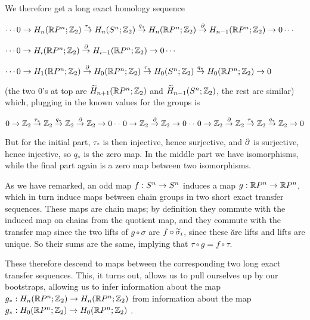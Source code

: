 \vfill
\eject

We therefore get a long exact homology sequence

\ssk

$\cdots 0\ra
H_n(\bbr P^n;\bbz_2)\buildrel{\tau_*}\over\ra
H_n(S^n;\bbz_2)\buildrel{q_*}\over\ra
H_n(\bbr P^n;\bbz_2)\buildrel{\del}\over\ra
H_{n-1}(\bbr P^n;\bbz_2)\ra
0\cdots$

$\cdots 0\ra H_i(\bbr P^n;\bbz_2)\buildrel{\del}\over\ra
H_{i-1}(\bbr P^n;\bbz_2)\ra
0\cdots$

$\cdots 0\ra
H_1(\bbr P^n;\bbz_2)\buildrel{\del}\over\ra
H_0(\bbr P^n;\bbz_2)\buildrel{\tau_*}\over\ra
H_0(S^n;\bbz_2)\buildrel{q_*}\over\ra
H_{0}(\bbr P^n;\bbz_2)\ra
0$

\ssk

(the two $0$'s at top are $\widetilde{H}_{n+1}({\Bbb R} P^n;{\Bbb Z}_2)$ and $\widetilde{H}_{n-1}(S^n;{\Bbb Z}_2)$, 
the rest are similar) which, plugging in the known values for the groups is 

\ssk

$0\ra\bbz_2\buildrel{\tau_*}\over\ra\bbz_2\buildrel{q_*}\over\ra\bbz_2\buildrel{\del}\over\ra
\bbz_2\ra 0\cdot\cdot\ 0\ra \bbz_2\buildrel{\del}\over\ra \bbz_2\ra 0\cdot\cdot\ 0\ra\bbz_2
\buildrel{\del}\over\ra\bbz_2\buildrel{\tau_*}\over\ra\bbz_2\buildrel{q_*}\over\ra
\bbz_2\ra 0$

\ssk

But for the initial part, $\tau_*$ is then injective, hence surjective, and $\partial$ is surjective, hence injective,
so $q_*$ is the zero map. In the middle part we have isomorphisms, while the final part again is a zero map
between two isomorphisms.

\msk


As we have remarked, an odd map $f:S^n\rightarrow S^n$ induces a map $g:{\Bbb R} P^n\rightarrow {\Bbb R} P^n$, which
in turn induce maps between chain groups in two short
exact transfer sequences. These maps are chain maps; by definition they commute
with the induced map on chains from the quotient map, and they commute with the transfer map since
the two lifts of $g\circ\sigma$ are $f\circ \widetilde{\sigma}_i$, since these \u{are} lifts and lifts are
unique. So their sums are the same, implying that $\tau\circ g = f\circ\tau$.

\ssk

These therefore descend to maps between the corresponding two long exact transfer sequences. 
This, it turns out, allows us to pull ourselves up by our bootstraps, allowing
us to infer information about the map $g_*:H_n({\Bbb R} P^n;{\Bbb Z}_2)\rightarrow H_n({\Bbb R} P^n;{\Bbb Z}_2)$
from information about the map $g_*:H_0({\Bbb R} P^n;{\Bbb Z}_2)\rightarrow H_0({\Bbb R} P^n;{\Bbb Z}_2)$ .

